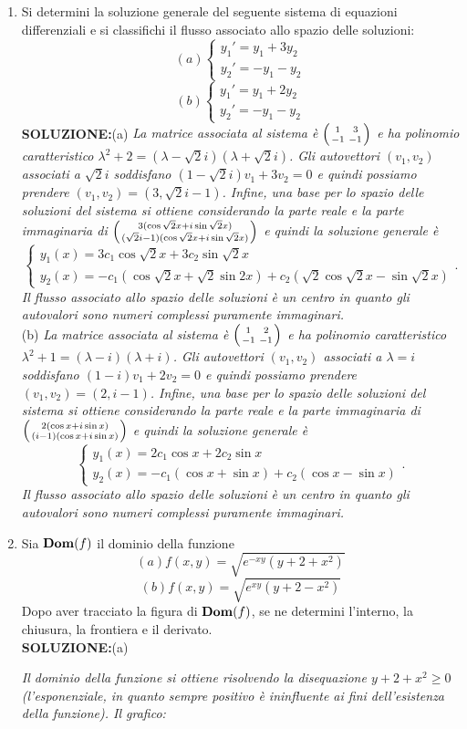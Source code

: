 \documentclass[12pt,a4paper]{report}\pagenumbering{roman}
\begin{document}
\begin{enumerate}
\item Si determini la soluzione generale del seguente sistema di 
equazioni differenziali e si classifichi il flusso associato allo spazio 
delle soluzioni:
$$(a) \left\{\begin{array}{l}y_1'=y_1+3y_2\\ y_2'=-y_1-y_2\end{array}\right.$$
$$(b) \left\{\begin{array}{l}y_1'=y_1+2y_2\\ y_2'=-y_1-y_2\end{array}\right.$$
{\bf SOLUZIONE:}(a) {\it La matrice associata al sistema \`e $\left({1\ \ \ 3\atop -1\ -1}\right)$ e ha
polinomio caratteristico $\lambda^2+2=(\lambda-\sqrt2i)(\lambda+\sqrt2i)$. Gli autovettori $(v_1,v_2)$
associati a $\sqrt2i$ soddisfano $(1-\sqrt2i)v_1+3v_2=0$ e quindi possiamo prendere $(v_1,v_2)=(3,\sqrt2i-1)$.
Infine, una base per lo spazio delle soluzioni del sistema si ottiene considerando
la parte reale e la parte immaginaria di 
$\left(3(\cos \sqrt2x+i\sin \sqrt2x)\atop (\sqrt2i-1)(\cos \sqrt2x+i\sin \sqrt2x)\right)$ e quindi la soluzione
generale \`e 
$$\left\{\begin{array}{l} y_1(x)=3c_1\cos \sqrt2x+3c_2\sin \sqrt2x\\
y_2(x)=-c_1(\cos \sqrt2x+\sqrt2\sin 2x)+c_2(\sqrt2\cos\sqrt2x-\sin\sqrt2x)\end{array} \right..$$
Il flusso associato allo spazio delle soluzioni 
\`e un centro in quanto gli autovalori sono numeri complessi puramente immaginari.}\\
(b) {\it La matrice associata al sistema \`e $\left({1\ \ \ 2\atop -1\ -1}\right)$ e ha
polinomio caratteristico $\lambda^2+1=(\lambda-i)(\lambda+i)$. Gli autovettori $(v_1,v_2)$
associati a $\lambda=i$ soddisfano $(1-i)v_1+2v_2=0$ e quindi possiamo prendere $(v_1,v_2)=(2,i-1)$.
Infine, una base per lo spazio delle soluzioni del sistema si ottiene considerando
la parte reale e la parte immaginaria di 
$\left(2(\cos x+i\sin x)\atop (i-1)(\cos x+i\sin x)\right)$ e quindi la soluzione
generale \`e 
$$\left\{\begin{array}{l} y_1(x)=2c_1\cos x+2c_2\sin x\\
y_2(x)=-c_1(\cos x+\sin x)+c_2(\cos x-\sin x)\end{array} \right..$$
Il flusso associato allo spazio delle soluzioni 
\`e un centro in quanto gli autovalori sono numeri complessi puramente immaginari.}

\item Sia ${\bf Dom}(f)$ il dominio della funzione 
$$(a) f(x,y)=\sqrt{e^{-xy}(y+2+x^2)}$$
$$(b) f(x,y)=\sqrt{e^{xy}(y+2-x^2)}$$
 Dopo aver tracciato la figura di ${\bf Dom}(f)$, se ne determini
l'interno, la chiusura, la frontiera e il derivato.\\
{\bf SOLUZIONE:}(a) {\it Il dominio della funzione si ottiene risolvendo la disequazione
$y+2+x^2\geq0$ (l'esponenziale, in quanto sempre positivo \`e ininfluente ai fini
dell'esistenza della funzione). Il grafico:
\medskip

}
\end{enumerate}
\end{document}
